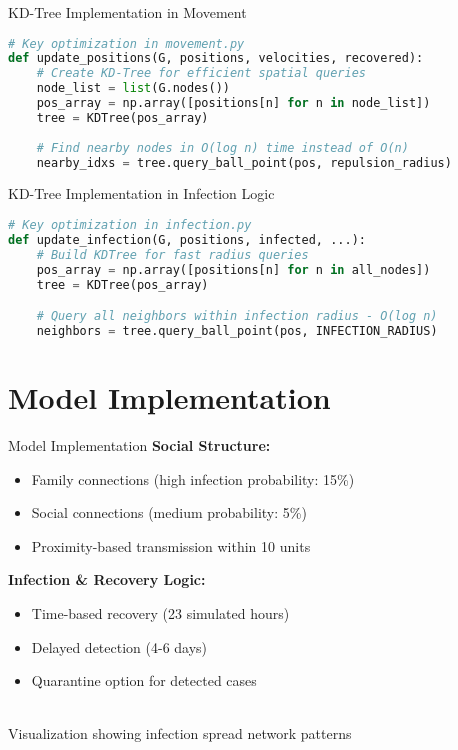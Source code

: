 \documentclass{beamer}
\begin{document}
\begin{frame}[fragile]{KD-Tree Implementation in Movement}
\begin{lstlisting}[language=Python]
# Key optimization in movement.py
def update_positions(G, positions, velocities, recovered):
    # Create KD-Tree for efficient spatial queries
    node_list = list(G.nodes())
    pos_array = np.array([positions[n] for n in node_list])
    tree = KDTree(pos_array)
    
    # Find nearby nodes in O(log n) time instead of O(n)
    nearby_idxs = tree.query_ball_point(pos, repulsion_radius)
\end{lstlisting}
\end{frame}

\begin{frame}[fragile]{KD-Tree Implementation in Infection Logic}
\begin{lstlisting}[language=Python]
# Key optimization in infection.py
def update_infection(G, positions, infected, ...):
    # Build KDTree for fast radius queries
    pos_array = np.array([positions[n] for n in all_nodes])
    tree = KDTree(pos_array)

    # Query all neighbors within infection radius - O(log n)
    neighbors = tree.query_ball_point(pos, INFECTION_RADIUS)
\end{lstlisting}
\end{frame}

\section{Model Implementation}
\begin{frame}{Model Implementation}
\textbf{Social Structure:}
\begin{itemize}
    \item Family connections (high infection probability: 15\%)
    \item Social connections (medium probability: 5\%)
    \item Proximity-based transmission within 10 units
\end{itemize}

\vspace{0.3cm}
\textbf{Infection \& Recovery Logic:}
\begin{itemize}
    \item Time-based recovery (23 simulated hours)
    \item Delayed detection (4-6 days)
    \item Quarantine option for detected cases
\end{itemize}

\vspace{0.3cm}
\begin{center}
    \\
    \small{Visualization showing infection spread network patterns}
\end{center}
\end{frame}
\end{document}
